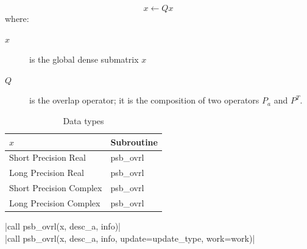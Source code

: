 \[ x \leftarrow Q x \]
where:
\begin{description}
\item[$x$] is the global dense submatrix $x$
\item[$Q$] is the overlap operator; it is the composition of two
operators $ P_a$ and $ P^{T}$. 
\end{description}

\begin{table}[h]
\begin{center}
\begin{tabular}{ll}
\hline
$x$ & {\bf Subroutine}\\
\hline
Short Precision Real & psb\_ovrl \\
Long Precision Real & psb\_ovrl \\
Short Precision Complex & psb\_ovrl \\
Long Precision Complex & psb\_ovrl \\
\hline
\end{tabular}
\end{center}
\caption{Data types\label{tab:f90ovrl}}
\end{table}

\noindent\fortinline|call psb_ovrl(x, desc_a, info)|\\
\fortinline|call psb_ovrl(x, desc_a, info, update=update_type, work=work)| 

